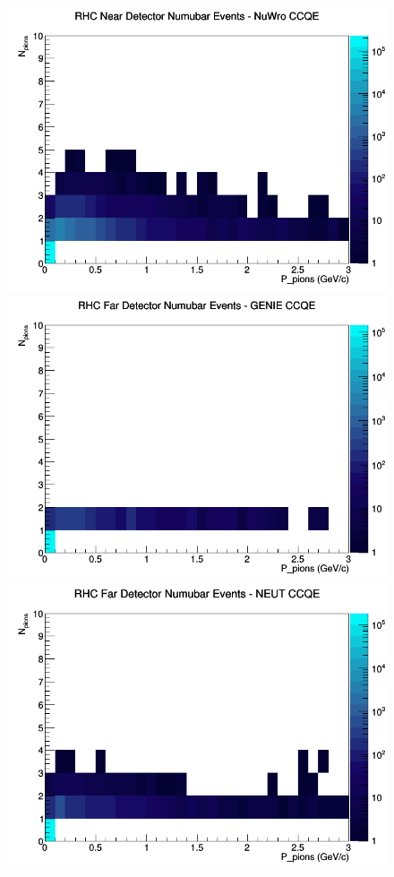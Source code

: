 \documentclass[12pt]{article}
\begin{document}
\begin{figure}[h]
\includegraphics[width=\linewidth]{N_P/nominal/pions/CCQE_RHC_ND_numubar_N_P_NuWro.png}
\endminipage
\newline
{}
\includegraphics[width=\linewidth]{N_P/nominal/pions/CCQE_RHC_FD_numubar_N_P_GENIE.png}
\endminipage
{}
\includegraphics[width=\linewidth]{N_P/nominal/pions/CCQE_RHC_FD_numubar_N_P_NEUT.png}

\end{figure}
\end{document}
